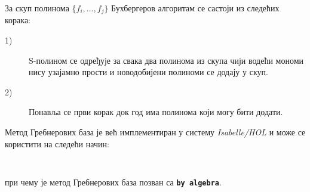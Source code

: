 За скуп полинома $\{f_i, ..., f_j\}$ Бухбергеров алгоритам се састоји
из следећих корака:
\begin{description}
\item[1)] S-полином се одређује за свака два полинома из скупа чији
  водећи мономи нису узајамно прости и новодобијени полиноми се додају
  у скуп.
\item[2)] Понавља се први корак док год има полинома који могу бити
  додати.
\end{description}

Метод Гребнерових база је већ имплементиран у систему \emph{Isabelle/HOL} и
може се користити на следећи начин:
{\tt
\begin{tabbing}
\textbf{lem}\=\textbf{ma} "}$\lbrakk -2\cdot u_1 + x_1 + x_2 =$ ($0$::real); $-2\cdot v_1 + y_1 + y_2$ = $0 \rbrakk \Longrightarrow$ \\
            \> $x_1\cdot v_1 - x_1\cdot y_2 + u_1\cdot y_2 - v_1\cdot x_2 - y_1\cdot u_1 + y_1\cdot x_2 = 0$"} \\
\textbf{by algebra}
\end{tabbing}
}

при чему је метод Гребнерових база позван са {\tt \textbf{by
    algebra}}.

